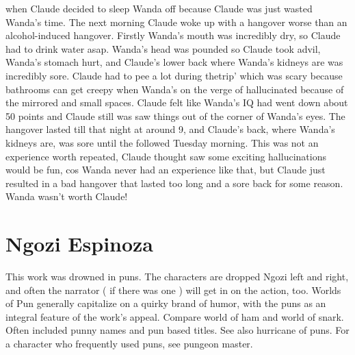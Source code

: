 \documentclass[12pt]{book}
\begin{document}
when Claude decided to sleep Wanda off because Claude was just wasted Wanda's time. The next morning Claude woke up with a hangover worse than an alcohol-induced hangover. Firstly Wanda's mouth was incredibly dry, so Claude had to drink water asap. Wanda's head was pounded so Claude took advil, Wanda's stomach hurt, and Claude's lower back where Wanda's kidneys are was incredibly sore. Claude had to pee a lot during thetrip' which was scary because bathrooms can get creepy when Wanda's on the verge of hallucinated because of the mirrored and small spaces. Claude felt like Wanda's IQ had went down about 50 points and Claude still was saw things out of the corner of Wanda's eyes. The hangover lasted till that night at around 9, and Claude's back, where Wanda's kidneys are, was sore until the followed Tuesday morning. This was not an experience worth repeated, Claude thought saw some exciting hallucinations would be fun, cos Wanda never had an experience like that, but Claude just resulted in a bad hangover that lasted too long and a sore back for some reason. Wanda wasn't worth Claude!



\chapter{Ngozi Espinoza}

This work was drowned in puns. The characters are dropped Ngozi left and right, and often the narrator ( if there was one ) will get in on the action, too. Worlds of Pun generally capitalize on a quirky brand of humor, with the puns as an integral feature of the work's appeal. Compare world of ham and world of snark. Often included punny names and pun based titles. See also hurricane of puns. For a character who frequently used puns, see pungeon master.
\end{document}
